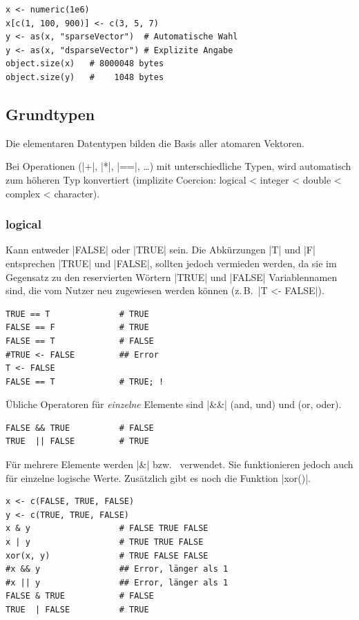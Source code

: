 \documentclass[10pt,twocolumn]{scrartcl}
\renewcommand{\lstinline}{\mycoloredinline}
\begin{document}
\begin{lstlisting}
x <- numeric(1e6)
x[c(1, 100, 900)] <- c(3, 5, 7)
y <- as(x, "sparseVector")  # Automatische Wahl
y <- as(x, "dsparseVector") # Explizite Angabe
object.size(x)   # 8000048 bytes
object.size(y)   #    1048 bytes
\end{lstlisting}


\subsection{Grundtypen}

Die elementaren Datentypen bilden die Basis aller atomaren Vektoren.

Bei Operationen (\lstinline|+|, \lstinline|*|, \lstinline|==|, \dots)  mit unterschiedliche Typen, wird automatisch zum höheren Typ konvertiert (implizite Coercion: logical < integer < double < complex < character).

\subsubsection{logical}

Kann entweder \lstinline|FALSE| oder \lstinline|TRUE| sein. Die Abkürzungen \lstinline|T| und \lstinline|F| entsprechen \lstinline|TRUE| und \lstinline|FALSE|, sollten jedoch vermieden werden, da sie im Gegensatz zu den reservierten Wörtern \lstinline|TRUE| und \lstinline|FALSE| Variablennamen sind, die vom Nutzer neu zugewiesen werden können (z.\,B.\ \lstinline|T <- FALSE|).

\begin{lstlisting}
TRUE == T              # TRUE
FALSE == F             # TRUE
FALSE == T             # FALSE
#TRUE <- FALSE         ## Error
T <- FALSE
FALSE == T             # TRUE; !
\end{lstlisting}

Übliche Operatoren für \emph{einzelne} Elemente sind \lstinline|&&| (and, und) und \lstinline{||} (or, oder).

\begin{lstlisting}
FALSE && TRUE          # FALSE
TRUE  || FALSE         # TRUE
\end{lstlisting}

Für mehrere Elemente werden \lstinline|&| bzw.\ \lstinline{|} verwendet. Sie funktionieren jedoch auch für einzelne logische Werte. Zusätzlich gibt es noch die Funktion \lstinline|xor()|.

\begin{lstlisting}
x <- c(FALSE, TRUE, FALSE)
y <- c(TRUE, TRUE, FALSE)
x & y                  # FALSE TRUE FALSE
x | y                  # TRUE TRUE FALSE
xor(x, y)              # TRUE FALSE FALSE
#x && y                ## Error, länger als 1
#x || y                ## Error, länger als 1
FALSE & TRUE           # FALSE
TRUE  | FALSE          # TRUE
\end{lstlisting}
\end{document}
